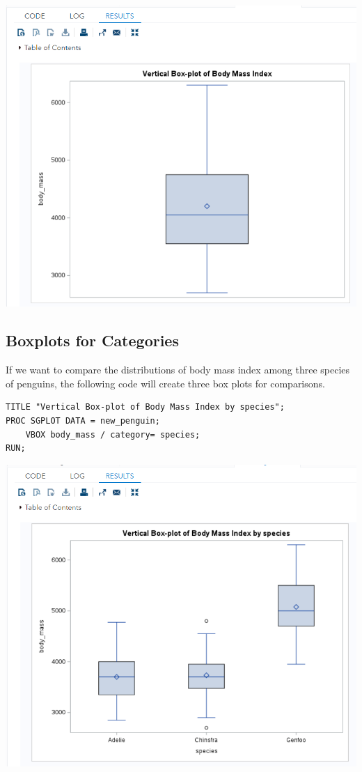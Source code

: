 \documentclass[
]{book}
\begin{document}
\begin{center}\includegraphics[width=1\linewidth]{img06/w06-Vboxplot} \end{center}

\hypertarget{boxplots-for-categories}{%
\subsection{Boxplots for Categories}\label{boxplots-for-categories}}

If we want to compare the distributions of body mass index among three species of penguins, the following code will create three box plots for comparisons.

\begin{verbatim}
TITLE "Vertical Box-plot of Body Mass Index by species";
PROC SGPLOT DATA = new_penguin;
    VBOX body_mass / category= species; 
RUN;
\end{verbatim}

\begin{center}\includegraphics[width=1\linewidth]{img06/w06-BoxplotbySpecies} \end{center}
\end{document}
